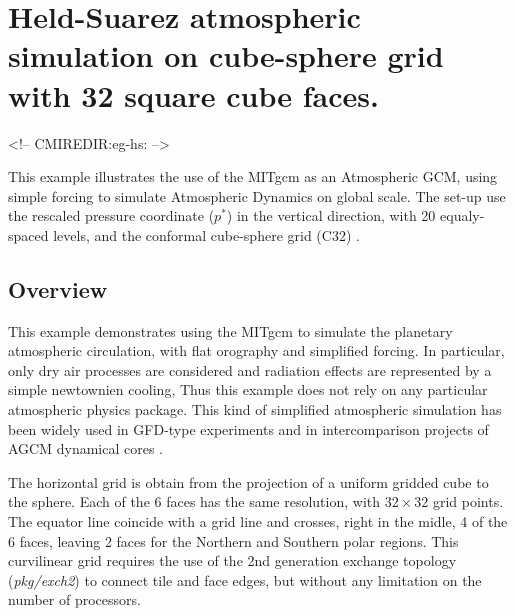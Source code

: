 
\section[Held-Suarez Atmosphere MITgcm Example]{Held-Suarez atmospheric simulation
on cube-sphere grid with 32 square cube faces.}
\label{www:tutorials}
\label{sect:eg-hs}
\begin{rawhtml}
<!-- CMIREDIR:eg-hs: -->
\end{rawhtml}


%
%

This example illustrates the use of the MITgcm as an Atmospheric GCM,
using simple \cite{held-suar:94} forcing 
to simulate Atmospheric Dynamics on global scale.
The set-up use the rescaled pressure coordinate ($p^*$)\cite[]{adcroft:04a}
in the vertical direction, with 20 equaly-spaced levels, and
the conformal cube-sphere grid (C32) \cite[]{adcroft:04b}.

\subsection{Overview}
\label{www:tutorials}

This example demonstrates using the MITgcm to simulate
the planetary atmospheric circulation, with flat orography
and simplified forcing.
In particular, only dry air processes are considered and 
radiation effects are represented by a simple newtownien cooling,
Thus this example does not rely on any particular atmospheric 
physics package.
This kind of simplified atmospheric simulation has been widely 
used in GFD-type experiments and in intercomparison projects of 
AGCM dynamical cores \cite[]{held-suar:94}.

The horizontal grid is obtain from the projection of a uniform gridded cube 
to the sphere. Each of the 6 faces has the same resolution, with 
$32 \times 32$ grid points. The equator line coincide with a grid line
and crosses, right in the midle, 4 of the 6 faces, leaving 2 faces 
for the Northern and Southern polar regions.
This curvilinear grid requires the use of the 2nd generation exchange
topology ({\it pkg/exch2}) to connect tile and face edges,
but without any limitation on the number of processors.

